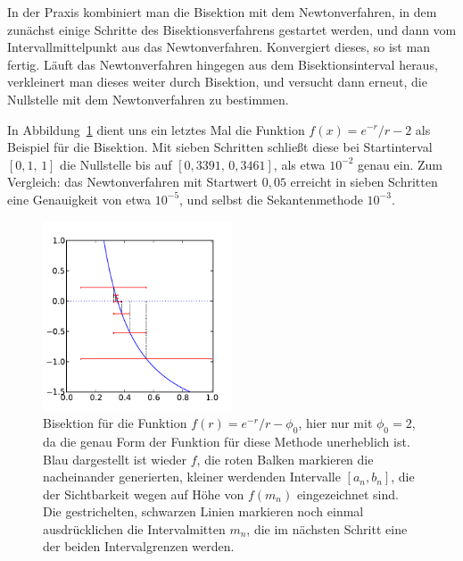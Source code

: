 In der Praxis kombiniert man die Bisektion mit dem Newtonverfahren, in
dem zunächst einige Schritte des Bisektionsverfahrens gestartet
werden, und dann vom Intervallmittelpunkt aus das
Newtonverfahren. Konvergiert dieses, so ist man fertig. Läuft das
Newtonverfahren hingegen aus dem Bisektionsinterval heraus,
verkleinert man dieses weiter durch Bisektion, und versucht dann
erneut, die Nullstelle mit dem Newtonverfahren zu bestimmen.

In Abbildung~\ref{fig:bisektion} dient uns ein letztes Mal die
Funktion $f(x) = e^{-r}/r - 2$ als Beispiel für die Bisektion. Mit
sieben Schritten schließt diese bei Startinterval $[0,1,\,1]$ die
Nullstelle bis auf $[0,3391,\,0,3461]$, als etwa $10^{-2}$ genau
ein. Zum Vergleich: das Newtonverfahren mit Startwert $0,05$ erreicht
in sieben Schritten eine Genauigkeit von etwa $10^{-5}$, und selbst
die Sekantenmethode $10^{-3}$.

\begin{figure}
  \centering
  \includegraphics[width=0.5\textwidth]{plots/bisektion}
  \caption{Bisektion für die Funktion $f(r) = e^{-r}/r -
    \phi_0$, hier nur mit $\phi_0=2$, da die genau Form der Funktion
    für diese Methode unerheblich ist. Blau dargestellt ist wieder
    $f$, die roten Balken markieren die nacheinander generierten,
    kleiner werdenden Intervalle $[a_n, b_n]$, die der Sichtbarkeit
    wegen auf Höhe von
    $f(m_n)$ eingezeichnet sind. Die gestrichelten, schwarzen Linien
    markieren noch einmal ausdrücklichen die Intervalmitten $m_n$, die
    im nächsten Schritt eine der beiden Intervalgrenzen werden.}
  \label{fig:bisektion}
\end{figure}

\section{}

